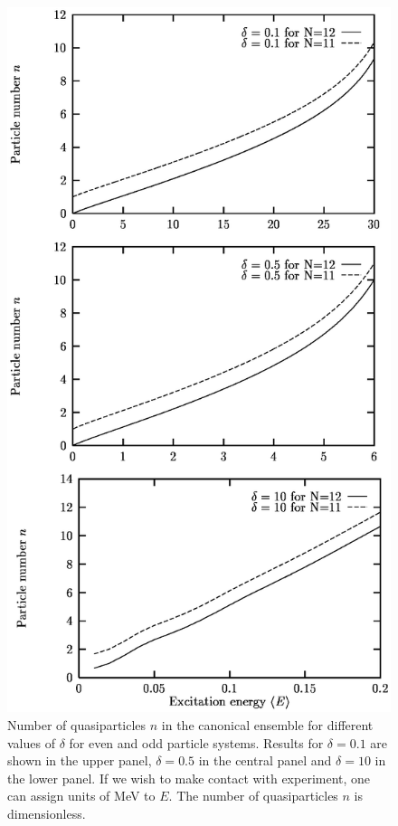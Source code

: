 \begin{figure}
\includegraphics[totalheight=18cm,angle=0,bb=0 20 350 730]{fig6.ps}
\caption{Number of quasiparticles $n$ in the canonical ensemble for different values of $\delta$ for even and odd particle systems. Results for $\delta=0.1$ are shown in the upper panel, $\delta=0.5$ in the central panel and $\delta=10$ in the lower panel. If we wish to make contact with experiment, one can assign units of MeV to $E$.
The number of quasiparticles $n$  is dimensionless.} 
\label{fig:fig6}
\end{figure}

